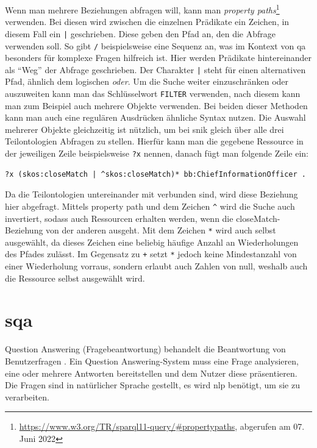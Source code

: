 Wenn man mehrere Beziehungen abfragen will, kann man \emph{property paths}\footnote{\url{https://www.w3.org/TR/sparql11-query/\#propertypaths}, abgerufen am 07. Juni 2022} verwenden.
Bei diesen wird zwischen die einzelnen Prädikate ein Zeichen, in diesem Fall ein \texttt{|} geschrieben.
Diese geben den Pfad an, den die Abfrage verwenden soll.
So gibt \texttt{/} beispielsweise eine Sequenz an, was im Kontext von \ac{qa} besonders für komplexe Fragen hilfreich ist.
Hier werden Prädikate hintereinander als \enquote{Weg} der Abfrage geschrieben.
Der Charakter \texttt{|} steht für einen alternativen Pfad, ähnlich dem logischen \emph{oder}.
Um die Suche weiter einzuschränken oder auszuweiten kann man das Schlüsselwort \texttt{FILTER} verwenden, nach diesem kann man zum Beispiel auch mehrere Objekte verwenden.
Bei beiden dieser Methoden kann man auch eine regulären Ausdrücken ähnliche Syntax nutzen.
Die Auswahl mehrerer Objekte gleichzeitig ist nützlich, um bei \acs{snik} gleich über alle drei Teilontologien Abfragen zu stellen.
Hierfür kann man die gegebene Ressource in der jeweiligen Zeile beispielsweise \texttt{?x} nennen, danach fügt man folgende Zeile ein:
\begin{lstlisting}[language=SPARQL]
?x (skos:closeMatch | ^skos:closeMatch)* bb:ChiefInformationOfficer .
\end{lstlisting}
Da die Teilontologien untereinander mit  verbunden sind, wird diese Beziehung hier abgefragt.
Mittels property path und dem Zeichen \texttt{\^} wird die Suche auch invertiert, sodass auch Ressourcen erhalten werden, wenn die closeMatch-Beziehung von der anderen ausgeht.
Mit dem Zeichen \texttt{*} wird auch  selbst ausgewählt, da dieses Zeichen eine beliebig häufige Anzahl an Wiederholungen des Pfades zulässt.
Im Gegensatz zu \texttt{+} setzt \texttt{*} jedoch keine Mindestanzahl von einer Wiederholung vorraus, sondern erlaubt auch Zahlen von null,
weshalb auch die Ressource selbst ausgewählt wird.

\section[Semantisches Question Answering]{\acl*{sqa}}

\begin{definition}
Question Answering (Fragebeantwortung) behandelt die Beantwortung von Benutzerfragen \citep{qadefinition}.
Ein Question Answering-System muss eine Frage analysieren, eine oder mehrere Antworten bereitstellen und dem Nutzer diese präsentieren.
Die Fragen sind in natürlicher Sprache gestellt, es wird \acs{nlp} benötigt, um sie zu verarbeiten.
\end{definition}

